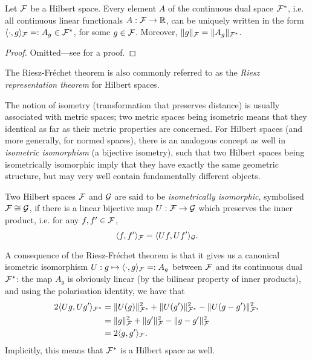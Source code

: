 \begin{theorem}
  Let ${\mathcal F}$ be a Hilbert space.
  Every element $A$ of the continuous dual space ${\mathcal F}^*$, i.e. all continuous linear functionals $A:{\mathcal F}\to\mathbb{R}$, can be uniquely written in the form $\langle\cdot,g\rangle_{\mathcal F} =: A_g \in {\mathcal F}^*$, for some $g\in{\mathcal F}$. 
  Moreover, $\lVert g\rVert_{\mathcal F} = \lVert A_g\rVert_{{\mathcal F}^*}$.
\end{theorem}

\begin{proof}
  Omitted---see \citet[Thm. 4.2.1]{yamamoto2012vector} for a proof.
\end{proof}

\begin{remark}
  The Riesz-Fréchet theorem is also commonly referred to as the \emph{Riesz representation theorem} for Hilbert spaces.
\end{remark}

The notion of isometry (transformation that preserves distance) is usually associated with metric spaces; two metric spaces being isometric means that they identical as far as their metric properties are concerned.
For Hilbert spaces (and more generally, for normed spaces), there is an analogous concept as well in \emph{isometric isomorphism} (a bijective isometry), such that two Hilbert spaces being isometrically isomorphic imply that they have exactly the same geometric structure, but may very well contain fundamentally different objects.

\begin{definition}
  Two Hilbert spaces ${\mathcal F}$ and ${\mathcal G}$ are said to be \emph{isometrically isomorphic}, symbolised ${\mathcal F} \cong {\mathcal G}$, if there is a linear bijective map $U:{\mathcal F}\to{\mathcal G}$ which preserves the inner product, i.e. for any $f,f'\in{\mathcal F}$, 
  \[
    \langle f,f'\rangle_{\mathcal F} = \langle Uf,Uf'\rangle_{\mathcal G}.
  \]
\end{definition}

A consequence of the Riesz-Fréchet theorem is that it gives us a canonical isometric isomorphism $U:g\mapsto \langle\cdot,g\rangle_{\mathcal F} =: A_g$ between ${\mathcal F}$ and its continuous dual ${\mathcal F}^*$:
the map $A_g$ is obviously linear (by the bilinear property of inner products), and using the polarisation identity, we have that
\begin{align*}
  2\langle Ug,Ug'\rangle_{{\mathcal F}^*} 
  &= \lVert U(g)\rVert_{{\mathcal F}^*}^2 + \lVert U(g')\rVert_{{\mathcal F}^*}^2 - \lVert U(g - g')\rVert_{{\mathcal F}^*}^2 \\
  &= \lVert g\rVert_{{\mathcal F}}^2 + \lVert g'\rVert_{{\mathcal F}}^2 - \lVert g-g'\rVert_{{\mathcal F}}^2 \\
  &= 2\langle g,g'\rangle_{{\mathcal F}}.
\end{align*}
Implicitly, this means that ${\mathcal F}^*$ is a Hilbert space as well.

